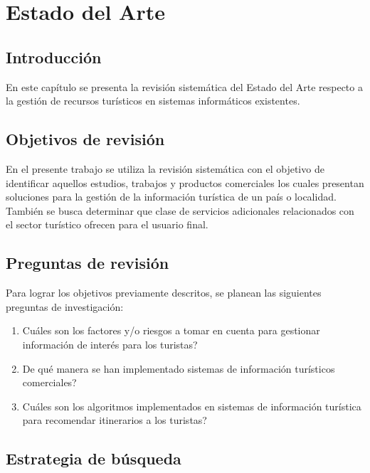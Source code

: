 
\chapter{Estado del Arte}

\section{Introducción}

En este capítulo se presenta la revisión sistemática del Estado del Arte
respecto a la gestión de recursos turísticos en sistemas informáticos existentes.

\section{Objetivos de revisión}

En el presente trabajo se utiliza la revisión sistemática con el objetivo de
identificar aquellos estudios, trabajos y productos comerciales los cuales presentan
soluciones para la gestión de la información turística de un país o localidad.
También se busca determinar que clase de servicios adicionales relacionados
con el sector turístico ofrecen para el usuario final.

\section{Preguntas de revisión}

Para lograr los objetivos previamente descritos, se planean las siguientes preguntas
de investigación:

\begin{enumerate}
    \item{Cuáles son los factores y/o riesgos a tomar en cuenta para gestionar
        información de interés para los turistas?}
    \item{De qué manera se han implementado sistemas de información turísticos
        comerciales?}
    \item{Cuáles son los algoritmos implementados en sistemas de información turística
        para recomendar itinerarios a los turistas?}
\end{enumerate}

\section{Estrategia de búsqueda}

